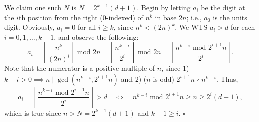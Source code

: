 We claim one such $N$ is $\boxed{N=2^{k-1}(d+1)}$. Begin by letting $a_i$ be the digit at the $i$th position from the right (0-indexed) of $n^k$ in base $2n$; i.e., $a_0$ is the units digit. Obviously, $a_i=0$ for all $i\ge k$, since $n^k<(2n)^k$. We WTS $a_i>d$ for each $i=0,1,\dots,k-1$, and observe the following:
\[ a_i=\left\lfloor\frac{n^k}{(2n)^i}\right\rfloor\text{ mod }2n=\left\lfloor\frac{n^{k-i}}{2^i}\right\rfloor\text{ mod }2n=\left\lfloor\frac{n^{k-i}\text{ mod }2^{i+1}n}{2^i}\right\rfloor. \]Note that the numerator is a positive multiple of $n$, since 1) $k-i>0\implies n\mid\gcd(n^{k-i},2^{i+1}n)$ and 2)
($n$ is odd) $2^{i+1}n\nmid n^{k-i}$. Thus,
\[ a_i=\left\lfloor\frac{n^{k-i}\text{ mod }2^{i+1}n}{2^i}\right\rfloor>d \quad\iff\quad n^{k-i}\text{ mod }2^{i+1}n\ge n\ge2^i(d+1), \]which is true since $n>N=2^{k-1}(d+1)$ and $k-1\ge i$. $\square$